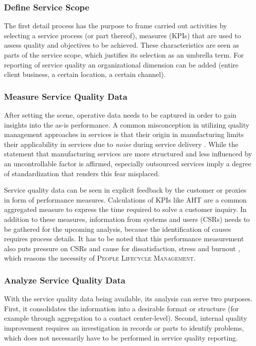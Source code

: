 	\subsubsection{Define Service Scope}
	The first detail process has the purpose to frame carried out activities by selecting a service process (or part thereof), measures (\acrshort{KPI}s) that are used to assess quality and objectives to be achieved. These characteristics are seen as parts of the service scope, which justifies its selection as an umbrella term. For reporting of service quality an organizational dimension can be added (entire client business, a certain location, a certain channel). 
	\subsubsection{Measure Service Quality Data}
	After setting the scene, operative data needs to be captured in order to gain insights into the as-is performance. A common misconception in utilizing quality management approaches in services is that their origin in manufacturing limits their applicability in services due to \textit{noise} during service delivery \citep{Antony_2007}. While the statement that manufacturing services are more structured and less influenced by an uncontrollable factor is affirmed, especially outsourced services imply a degree of standardization that renders this fear misplaced. 
	
	Service quality data can be seen in explicit feedback by the customer or proxies in form of performance measures. Calculations of \acrshort{KPI}s like \acrfull{AHT} are a common aggregated measure to express the time required to solve a customer inquiry. In addition to these measures, information from systems and users (\acrshort{CSR}s) needs to be gathered for the upcoming analysis, because the identification of causes requires process details. It has to be noted that this performance measurement  also puts pressure on \acrshort{CSR}s and cause for dissatisfaction, stress and burnout \citep[]{Aksin_2009}, which reasons the necessity of \textsc{People Lifecycle Management}.
	
	\subsubsection{Analyze Service Quality Data}
	With the service quality data being available, its analysis can serve two purposes. First, it consolidates the information into a desirable format or structure (for example through aggregation to a contact center-level). Second, internal quality improvement requires an investigation in records or parts to identify problems, which does not necessarily have to be performed in service quality reporting. 
	
